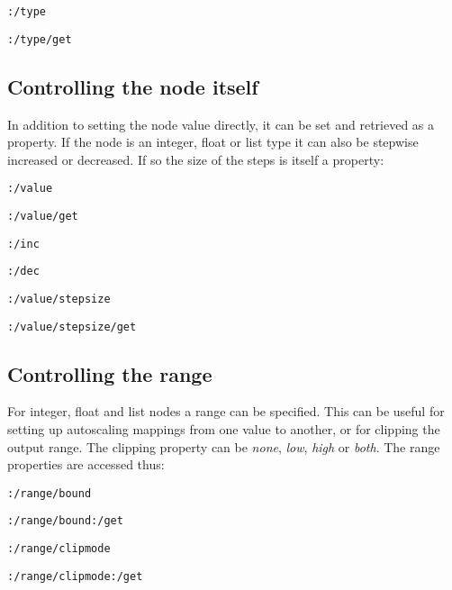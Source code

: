\documentclass{NIME-alternate}
\begin{document}
\texttt{:/type}

\texttt{:/type/get}





\subsection{Controlling the node itself} %
\label{sub:controlling_the_node_itself}

In addition to setting the node value directly, it can be set and retrieved as a property. If the node is an integer, float or list type it can also be stepwise increased or decreased. If so the size of the steps is itself a property:

\texttt{:/value}

\texttt{:/value/get}

\texttt{:/inc}

\texttt{:/dec} 

\texttt{:/value/stepsize}

\texttt{:/value/stepsize/get}





\subsection{Controlling the range} %
\label{sub:range}

For integer, float and list nodes a range can be specified. This can be useful for setting up autoscaling mappings from one value to another, or for clipping the output range. The clipping property can be \emph{none}, \emph{low}, \emph{high} or \emph{both}. The range properties are accessed thus:

\texttt{:/range/bound}

\texttt{:/range/bound:/get}

\texttt{:/range/clipmode}

\texttt{:/range/clipmode:/get}
\end{document}
